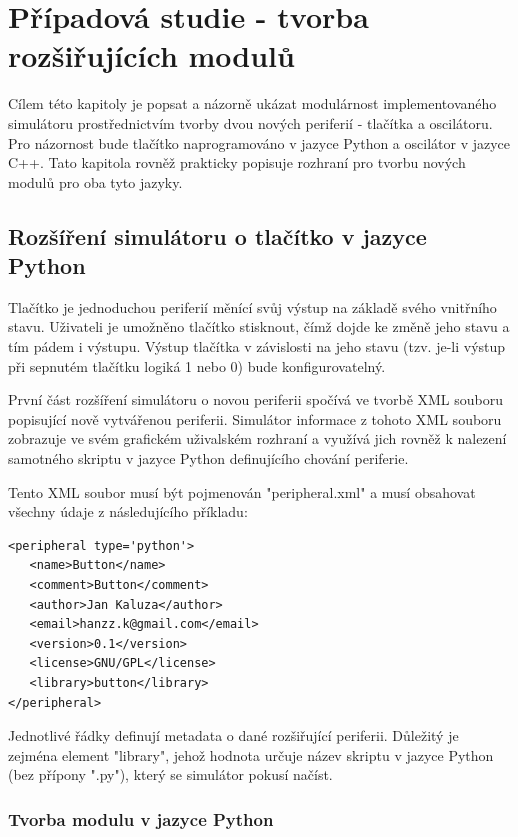 \chapter{Případová studie - tvorba rozšiřujících modulů}
\label{pripad}

Cílem této kapitoly je popsat a názorně ukázat modulárnost implementovaného simulátoru prostřednictvím tvorby dvou nových periferií - tlačítka a oscilátoru. Pro názornost bude tlačítko naprogramováno v jazyce Python a oscilátor v jazyce C++. Tato kapitola rovněž prakticky popisuje rozhraní pro tvorbu nových modulů pro oba tyto jazyky.

\section{Rozšíření simulátoru o tlačítko v jazyce Python}
\label{tlacitko}

Tlačítko je jednoduchou periferií měnící svůj výstup na základě svého vnitřního stavu. Uživateli je umožněno tlačítko stisknout, čímž dojde ke změně jeho stavu a tím pádem i výstupu. Výstup tlačítka v závislosti na jeho stavu (tzv. je-li výstup při sepnutém tlačítku logiká 1 nebo 0) bude konfigurovatelný.

První část rozšíření simulátoru o novou periferii spočívá ve tvorbě XML souboru popisující nově vytvářenou periferii. Simulátor informace z tohoto XML souboru zobrazuje ve svém grafickém uživalském rozhraní a využívá jich rovněž k nalezení samotného skriptu v jazyce Python definujícího chování periferie.

Tento XML soubor musí být pojmenován "peripheral.xml" a musí obsahovat všechny údaje z následujícího příkladu:

\lstset{language=XML, numbers=left, frame=single, breaklines=true, tabsize=2, xleftmargin=20pt}
\begin{lstlisting}
<peripheral type='python'>
   <name>Button</name>
   <comment>Button</comment>
   <author>Jan Kaluza</author>
   <email>hanzz.k@gmail.com</email>
   <version>0.1</version>
   <license>GNU/GPL</license>
   <library>button</library>
</peripheral>
\end{lstlisting}

Jednotlivé řádky definují metadata o dané rozšiřující periferii. Důležitý je zejména element "library", jehož hodnota určuje název skriptu v jazyce Python (bez přípony ".py"), který se simulátor pokusí načíst.

\subsection{Tvorba modulu v jazyce Python}

